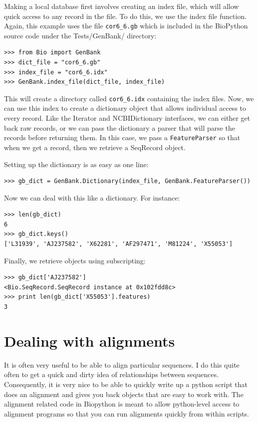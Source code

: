 \documentclass{report}
\begin{document}
Making a local database first involves creating an index file, which will allow quick access to any record in the file. To do this, we use the index file function.
Again, this example uses the file \verb|cor6_6.gb| which is included in the BioPython source code under the Tests/GenBank/ directory:

\begin{verbatim}
>>> from Bio import GenBank
>>> dict_file = "cor6_6.gb"
>>> index_file = "cor6_6.idx"
>>> GenBank.index_file(dict_file, index_file)
\end{verbatim}

This will create a directory called \verb|cor6_6.idx| containing the index files. Now, we can use this index to create a dictionary object that allows individual access to every record. Like the Iterator and NCBIDictionary interfaces, we can either get back raw records, or we can pass the dictionary a parser that will parse the records before returning them. In this case, we pass a \verb|FeatureParser| so that when we get a record, then we retrieve a SeqRecord object.

Setting up the dictionary is as easy as one line:

\begin{verbatim}
>>> gb_dict = GenBank.Dictionary(index_file, GenBank.FeatureParser())
\end{verbatim}

Now we can deal with this like a dictionary. For instance:

\begin{verbatim}
>>> len(gb_dict)
6
>>> gb_dict.keys()
['L31939', 'AJ237582', 'X62281', 'AF297471', 'M81224', 'X55053']
\end{verbatim}

Finally, we retrieve objects using subscripting:

\begin{verbatim}
>>> gb_dict['AJ237582']
<Bio.SeqRecord.SeqRecord instance at 0x102fdd8c>
>>> print len(gb_dict['X55053'].features)
3
\end{verbatim}

\section{Dealing with alignments}

It is often very useful to be able to align particular sequences. I do this quite often to get a quick and dirty idea of relationships between sequences. Consequently, it is very nice to be able to quickly write up a python script that does an alignment and gives you back objects that are easy to work with. The alignment related code in Biopython is meant to allow python-level access to alignment programs so that you can run alignments quickly from within scripts.
\end{document}

